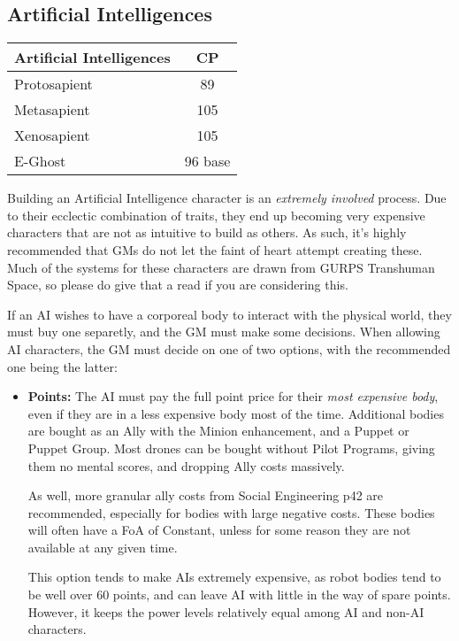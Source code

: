 \begin{multicols*}{3}
	\subsection{Artificial Intelligences}
	
	\begin{center}
		\begin{tabularx}{0.32\textwidth}{|X|c|}
			\hline
			Artificial Intelligences & CP \\
			\hline
			\hline
			Protosapient & 89\\
			Metasapient & 105\\
			Xenosapient & 105 \\
			E-Ghost & 96 base\\
			\hline
		\end{tabularx}
	\end{center}
	
	Building an Artificial Intelligence character is an \textit{extremely involved} process. Due to their ecclectic combination of traits, they end up becoming very expensive characters that are not as intuitive to build as others. As such, it's highly recommended that GMs do not let the faint of heart attempt creating these. Much of the systems for these characters are drawn from GURPS Transhuman Space, so please do give that a read if you are considering this.
	
	If an AI wishes to have a corporeal body to interact with the physical world, they must buy one separetly, and the GM must make some decisions. When allowing AI characters, the GM must decide on one of two options, with the recommended one being the latter:
	\begin{itemize}
		\item \textbf{Points: } The AI must pay the full point price for their \textit{most expensive body}, even if they are in a less expensive body most of the time. Additional bodies are bought as an Ally with the Minion enhancement, and a Puppet or Puppet Group. Most drones can be bought without Pilot Programs, giving them no mental scores, and dropping Ally costs massively. 
		
		As well, more granular ally costs from Social Engineering p42 are recommended, especially for bodies with large negative costs. These bodies will often have a FoA of Constant, unless for some reason they are not available at any given time. 
		
		This option tends to make AIs extremely expensive, as robot bodies tend to be well over 60 points, and can leave AI with little in the way of spare points. However, it keeps the power levels relatively equal among AI and non-AI characters. 
		

\end{itemize}
\end{multicols*}

